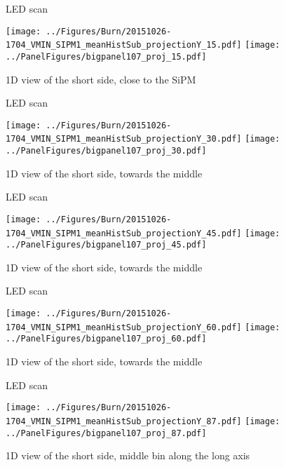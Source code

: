 \documentclass[compress,8pt]{beamer} %
\begin{document}
\begin{frame}{LED scan}
\begin{adjustwidth}{-3em}{-3em}
\begin{center}
\texttt{[image: ../Figures/Burn/20151026-1704\_VMIN\_SIPM1\_meanHistSub\_projectionY\_15.pdf]}
\texttt{[image: ../PanelFigures/bigpanel107\_proj\_15.pdf]}
\end{center}
\end{adjustwidth}
1D view of the short side, close to the SiPM
\end{frame}


\begin{frame}{LED scan}
\begin{adjustwidth}{-3em}{-3em}
\begin{center}
\texttt{[image: ../Figures/Burn/20151026-1704\_VMIN\_SIPM1\_meanHistSub\_projectionY\_30.pdf]}
\texttt{[image: ../PanelFigures/bigpanel107\_proj\_30.pdf]}
\end{center}
\end{adjustwidth}
1D view of the short side, towards the middle
\end{frame}


\begin{frame}{LED scan}
\begin{adjustwidth}{-3em}{-3em}
\begin{center}
\texttt{[image: ../Figures/Burn/20151026-1704\_VMIN\_SIPM1\_meanHistSub\_projectionY\_45.pdf]}
\texttt{[image: ../PanelFigures/bigpanel107\_proj\_45.pdf]}
\end{center}
\end{adjustwidth}
1D view of the short side, towards the middle
\end{frame}


\begin{frame}{LED scan}
\begin{adjustwidth}{-3em}{-3em}
\begin{center}
\texttt{[image: ../Figures/Burn/20151026-1704\_VMIN\_SIPM1\_meanHistSub\_projectionY\_60.pdf]}
\texttt{[image: ../PanelFigures/bigpanel107\_proj\_60.pdf]}
\end{center}
\end{adjustwidth}
1D view of the short side, towards the middle
\end{frame}


\begin{frame}{LED scan}
\begin{adjustwidth}{-3em}{-3em}
\begin{center}
\texttt{[image: ../Figures/Burn/20151026-1704\_VMIN\_SIPM1\_meanHistSub\_projectionY\_87.pdf]}
\texttt{[image: ../PanelFigures/bigpanel107\_proj\_87.pdf]}
\end{center}
\end{adjustwidth}
1D view of the short side, middle bin along the long axis
\end{frame}
\end{document}
